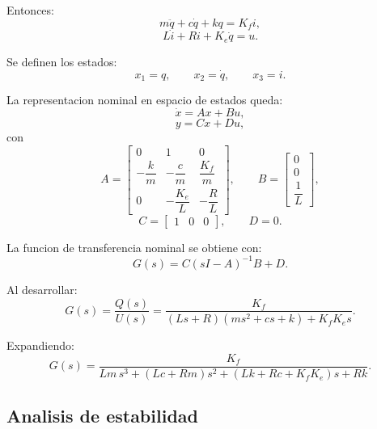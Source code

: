 \documentclass[11pt]{article}
\begin{document}
Entonces:
\begin{equation}
m\ddot q + c\dot q + kq = K_f i,
\end{equation}
\begin{equation}
L\dot i + Ri + K_e\dot q = u.
\end{equation}

Se definen los estados:
\[
x_1=q,\qquad x_2=\dot q,\qquad x_3=i.
\]

La representacion nominal en espacio de estados queda:
\begin{equation}
\dot x = Ax+Bu,
\end{equation}
\begin{equation}
y = Cx+Du,
\end{equation}
con
\begin{equation}
A=
\begin{bmatrix}
0 & 1 & 0\\
-\dfrac{k}{m} & -\dfrac{c}{m} & \dfrac{K_f}{m}\\
0 & -\dfrac{K_e}{L} & -\dfrac{R}{L}
\end{bmatrix},
\qquad
B=
\begin{bmatrix}
0\\
0\\
\dfrac{1}{L}
\end{bmatrix},
\end{equation}
\begin{equation}
C=
\begin{bmatrix}
1 & 0 & 0
\end{bmatrix},
\qquad
D=0.
\end{equation}

La funcion de transferencia nominal se obtiene con:
\begin{equation}
G(s)=C(sI-A)^{-1}B+D.
\end{equation}

Al desarrollar:
\begin{equation}
G(s)=\frac{Q(s)}{U(s)}
=
\frac{K_f}
{(Ls+R)(ms^2+cs+k)+K_fK_e s}.
\label{eq:tf3}
\end{equation}

Expandiendo:
\begin{equation}
G(s)=
\frac{K_f}
{Lm\,s^3 + (Lc+Rm)s^2 + (Lk+Rc+K_fK_e)s + Rk}.
\end{equation}

\subsection{Analisis de estabilidad}
\end{document}
